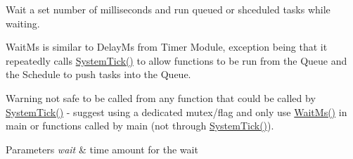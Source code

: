 Wait a set number of milliseconds and run queued or shceduled tasks while waiting. 

Wait\+Ms is similar to Delay\+Ms from Timer Module, exception being that it repeatedly calls \hyperlink{group__task_gafd2aa563748d1ede229e5867753ead5d}{System\+Tick()} to allow functions to be run from the Queue and the Schedule to push tasks into the Queue.

\begin{DoxyWarning}{Warning}
not safe to be called from any function that could be called by \hyperlink{group__task_gafd2aa563748d1ede229e5867753ead5d}{System\+Tick()} -\/ suggest using a dedicated mutex/flag and only use \hyperlink{group__task_ga51a214a49e3bca310762452c27c47c90}{Wait\+Ms()} in main or functions called by main (not through \hyperlink{group__task_gafd2aa563748d1ede229e5867753ead5d}{System\+Tick()}).
\end{DoxyWarning}

\begin{DoxyParams}{Parameters}
{\em wait} & time amount for the wait \\
\hline
\end{DoxyParams}
